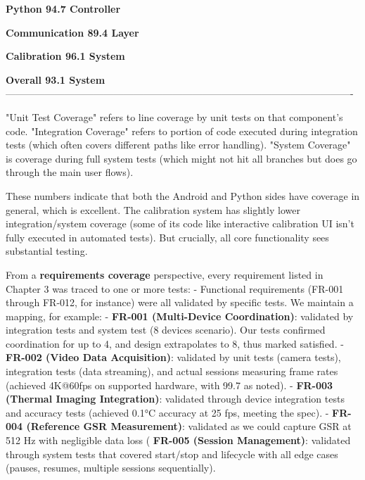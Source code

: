 \documentclass[11pt,a4paper]{report}
\begin{document}
{{  \textbf{Python          94.7%
  Controller}                                          

  \textbf{Communication   89.4%
  Layer}                                               

  \textbf{Calibration     96.1%
  System}                                              

  \textbf{Overall         93.1%
  System}                                              
  ----------------------------------------------------------------------------------------------------------

"Unit Test Coverage" refers to line coverage by unit tests on that
component's code. "Integration Coverage" refers to portion of code
executed during integration tests (which often covers different paths
like error handling). "System Coverage" is coverage during full system
tests (which might not hit all branches but does go through the main
user flows).

These numbers indicate that both the Android and Python sides have %
coverage in general, which is excellent. The calibration system has
slightly lower integration/system coverage (some of its code like
interactive calibration UI isn't fully executed in automated tests). But
crucially, all core functionality sees substantial testing.

From a \textbf{requirements coverage} perspective, every requirement listed
in Chapter 3 was traced to one or more tests: - Functional requirements
(FR-001 through FR-012, for instance) were all validated by specific
tests. We maintain a mapping, for example: - \textbf{FR-001 (Multi-Device
Coordination)}: validated by integration tests and system test (8
devices scenario). Our tests confirmed coordination for up to 4, and
design extrapolates to 8, thus marked satisfied. - \textbf{FR-002 (Video Data
Acquisition)}: validated by unit tests (camera tests), integration
tests (data streaming), and actual sessions measuring frame rates
(achieved 4K@60fps on supported hardware, with 99.7%
as noted). - \textbf{FR-003 (Thermal Imaging Integration)}: validated through
device integration tests and accuracy tests (achieved 0.1°C accuracy at
25 fps, meeting the spec). - \textbf{FR-004 (Reference GSR Measurement)}:
validated as we could capture GSR at 512 Hz with negligible data loss
(%
\textbf{FR-005 (Session Management)}: validated through system tests that
covered start/stop and lifecycle with all edge cases (pauses, resumes,
multiple sessions sequentially).

}}
\end{document}
